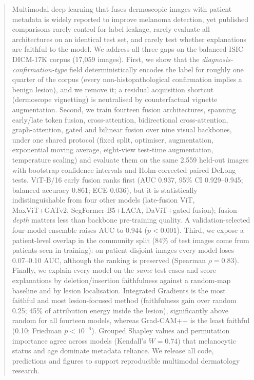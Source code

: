 \documentclass[journal]{IEEEtran}
\begin{document}
\begin{abstract}
Multimodal deep learning that fuses dermoscopic images with patient metadata is widely reported to improve melanoma detection, yet published comparisons rarely control for label leakage, rarely evaluate all architectures on an identical test set, and rarely test whether explanations are faithful to the model. We address all three gaps on the balanced ISIC-DICM-17K corpus (17,059 images). First, we show that the \emph{diagnosis-confirmation-type} field deterministically encodes the label for roughly one quarter of the corpus (every non-histopathological confirmation implies a benign lesion), and we remove it; a residual acquisition shortcut (dermoscope vignetting) is neutralised by counterfactual vignette augmentation. Second, we train fourteen fusion architectures, spanning early/late token fusion, cross-attention, bidirectional cross-attention, graph-attention, gated and bilinear fusion over nine visual backbones, under one shared protocol (fixed split, optimiser, augmentation, exponential moving average, eight-view test-time augmentation, temperature scaling) and evaluate them on the same 2,559 held-out images with bootstrap confidence intervals and Holm-corrected paired DeLong tests. ViT-B/16 early fusion ranks first (AUC 0.937, 95\% CI 0.929--0.945; balanced accuracy 0.861; ECE 0.036), but it is statistically indistinguishable from four other models (late-fusion ViT, MaxViT+GATv2, SegFormer-B5+LACA, DaViT+gated fusion); fusion \emph{depth} matters less than backbone pre-training quality. A validation-selected four-model ensemble raises AUC to 0.944 ($p<0.001$). Third, we expose a patient-level overlap in the community split (84\% of test images come from patients seen in training): on patient-disjoint images every model loses 0.07--0.10 AUC, although the ranking is preserved (Spearman $\rho=0.83$). Finally, we explain every model on the \emph{same} test cases and score explanations by deletion/insertion faithfulness against a random-map baseline and by lesion localisation. Integrated Gradients is the most faithful and most lesion-focused method (faithfulness gain over random 0.25; 45\% of attribution energy inside the lesion), significantly above random for all fourteen models, whereas Grad-CAM++ is the least faithful (0.10; Friedman $p<10^{-6}$). Grouped Shapley values and permutation importance agree across models (Kendall's $W=0.74$) that melanocytic status and age dominate metadata reliance.
We release all code, predictions and figures to support reproducible multimodal dermatology research.
\end{abstract}
\end{document}
